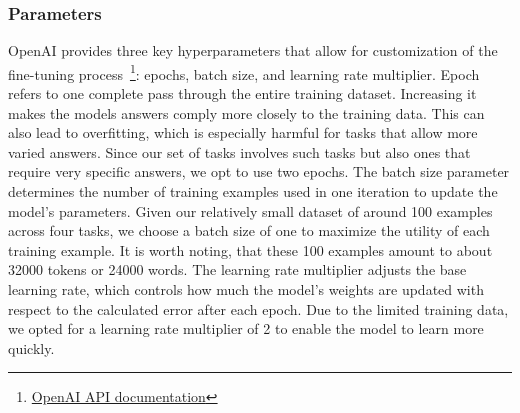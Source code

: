 \subsubsection{Parameters}
OpenAI provides three key hyperparameters that allow for customization of the fine-tuning process~\footnote{\href{https://platform.openai.com/docs/api-reference/fine-tuning/create\#fine-tuning-create-hyperparameters}{OpenAI API documentation}}: epochs, batch size, and learning rate multiplier. Epoch refers to one complete pass through the entire training dataset. Increasing it makes the models answers comply more closely to the training data. This can also lead to overfitting, which is especially harmful for tasks that allow more varied answers. Since our set of tasks involves such tasks but also ones that require very specific answers, we opt to use two epochs. The batch size parameter determines the number of training examples used in one iteration to update the model’s parameters. Given our relatively small dataset of around 100 examples across four tasks, we choose a batch size of one to maximize the utility of each training example. It is worth noting, that these 100 examples amount to about 32000 tokens or 24000 words. The learning rate multiplier adjusts the base learning rate, which controls how much the model’s weights are updated with respect to the calculated error after each epoch. Due to the limited training data, we opted for a learning rate multiplier of 2 to enable the model to learn more quickly. 

